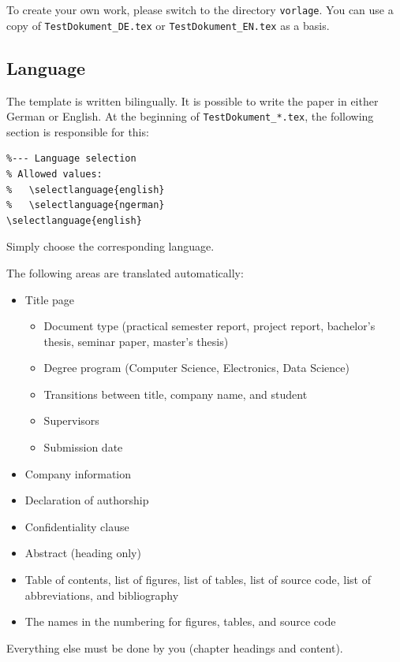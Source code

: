 \documentclass[pdftex,a4paper]{scrartcl}
\begin{document}
To create your own work, please switch to the directory
\texttt{vorlage}.
You can use a copy of \texttt{TestDokument\_DE.tex} or \texttt{TestDokument\_EN.tex}  as a basis.

\subsection{Language}
\label{sec:sprache}

The template is written bilingually.
It is possible to write the paper in either German or English.
At the beginning of \texttt{TestDokument\_*.tex}, the following section is responsible for this:

\begin{verbatim}
%--- Language selection
% Allowed values:
%   \selectlanguage{english}
%   \selectlanguage{ngerman}
\selectlanguage{english}
\end{verbatim}

Simply choose the corresponding language.

The following areas are translated automatically:

\begin{itemize}
  \item Title page
  \begin{itemize}
    \item Document type (practical semester report, project report, bachelor's thesis, seminar paper, master's thesis)
    \item Degree program (Computer Science, Electronics, Data Science)
    \item Transitions between title, company name, and student
    \item Supervisors
    \item Submission date
  \end{itemize}
  \item Company information
  \item Declaration of authorship
  \item Confidentiality clause
  \item Abstract (heading only)
  \item Table of contents, list of figures, list of tables, list of source code, list of abbreviations, and bibliography
  \item The names in the numbering for figures, tables, and source code
\end{itemize}

Everything else must be done by you (chapter headings and content).
\end{document}
